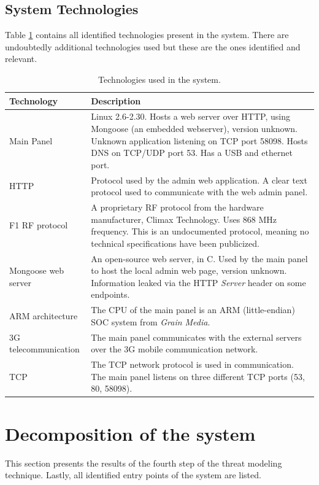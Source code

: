 \subsection{System Technologies}
Table \ref{tb:system-technologies} contains all identified technologies present in the system. There are undoubtedly additional technologies used but these are the ones identified and relevant.
\begin{table}[!p]
    \centering
    \begin{tabularx}{\textwidth}{l X}
        \hline
        \textbf{Technology}  & \textbf{Description}
        \\ \hline
        Main Panel & Linux 2.6-2.30. Hosts a web server over HTTP, using Mongoose (an embedded webserver), version unknown. Unknown application listening on TCP port 58098. Hosts DNS on TCP/UDP port 53. Has a USB and ethernet port.
        \\ \hline
        HTTP  & Protocol used by the admin web application. A clear text protocol used to communicate with the web admin panel.
        \\ \hline
        F1 RF protocol  & A proprietary \gls{RF} protocol from the hardware manufacturer, Climax Technology. Uses 868 MHz frequency. This is an undocumented protocol, meaning no technical specifications have been publicized.
        \\ \hline
        Mongoose web server  & An open-source web server, in C. Used by the main panel to host the local admin web page, version unknown. Information leaked via the HTTP \textit{Server} header on some endpoints.
        \\ \hline
        ARM architecture  & The CPU of the main panel is an ARM (little-endian) SOC system from \textit{Grain Media}.
        \\ \hline
        3G telecommunication  & The main panel communicates with the external servers over the 3G mobile communication network.
        \\ \hline
        TCP  & The \gls{TCP} network protocol is used in communication. The main panel listens on three different TCP ports (53, 80, 58098).
        \\ \hline
    \end{tabularx}
    \caption{Technologies used in the system.}
    \label{tb:system-technologies}
\end{table}

\section{Decomposition of the system}
This section presents the results of the fourth step of the threat modeling technique. Lastly, all identified entry points of the system are listed.

